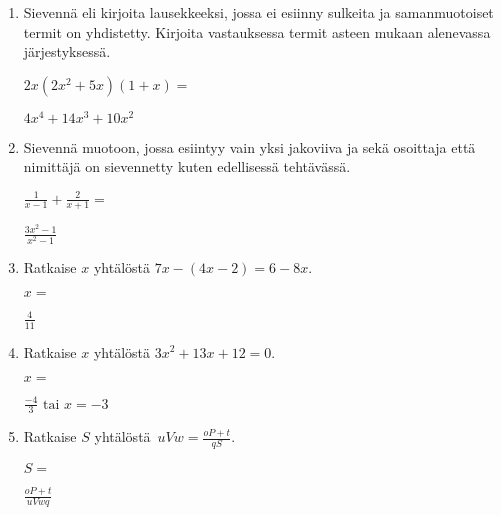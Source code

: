 \documentclass[finnish, a4paper, 12pt]{article}
\begin{document}
\begin{enumerate}[leftmargin=*]
		\vspace{8pt}
		
		\item %
		Sievennä eli kirjoita lausekkeeksi, jossa ei esiinny sulkeita ja 
		samanmuotoiset termit on yhdistetty. 
		Kirjoita vastauksessa termit asteen mukaan alenevassa järjestyksessä. 
		
		\(
		\displaystyle
		2x(2x^2 + 5x)(1 + x) = 
		\) %
		\begin{version:withAnswers}
		\( 4x^4 +14x^3 +10x^2 \)
		\end{version:withAnswers}
		
		\vspace{8pt}
		
		\item %
		Sievennä %
		muotoon, jossa esiintyy vain yksi jakoviiva ja sekä osoittaja
		että nimittäjä on sievennetty kuten edellisessä tehtävässä.
		
		\(
		\displaystyle
		\frac{1}{x-1}+ \frac{ 2}{x + 1} =
		\) %
		\begin{version:withAnswers}
		\( \frac{3x^2 - 1}{x^2  - 1} \)
		\end{version:withAnswers}
		
		\vspace{8pt}
		
		\item %
		Ratkaise \(x\) yhtälöstä \(7x - (4x-2) = 6 - 8x\).
		
		\(
		x = 
		\)	%
		\begin{version:withAnswers}
		 \( \frac{4}{11} \)
		\end{version:withAnswers}
		\vspace{8pt}
		
		\item %
		Ratkaise \(x\) yhtälöstä \(3 x^2  + 13 x + 12= 0\).
		
		\(
		x = 		
		\)	%
		
		\begin{version:withAnswers}
		\(\frac{-4}{3} \text{  tai } x = -3\)
		\end{version:withAnswers}
		\vspace{8pt}
		
		\item %
		Ratkaise \(S\) yhtälöstä 
		\(
		\displaystyle \,
		uVw = \frac{oP+t}{qS} .
		\)	
		
		\(
		S = 
		\) %
		\begin{version:withAnswers}
		\( \frac{oP+t}{uVwq}\)
		\end{version:withAnswers}
		
	\end{enumerate}
	
	
\end{document}
